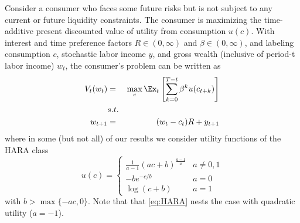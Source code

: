 
Consider a consumer who faces some future risks but is not subject to any current or future liquidity constraints.  The consumer is maximizing the time-additive present discounted value of utility from consumption $u(c)$.  With interest and time preference factors $R \in (0,\infty)$ and $\beta \in (0,\infty)$, and labeling consumption $c$, stochastic labor income $y$, and gross wealth (inclusive of period-t labor income) $w_{t}$, the consumer's problem can be written as
\begin{eqnarray*}
V_{t}(w_{t}) &=&
                 \max_{c} \Ex_{t}\left[\sum_{k=0}^{T-t}\beta^{k} u({c_{t+k}})\right]   \label{eq:valuefn} \\
   & s.t. &  \nonumber
\\              w_{t+1} & = & (w_{t}-c_{t})R+y_{t+1} %
\nonumber
\end{eqnarray*}
where in some (but not all) of our results we consider utility functions of the HARA class
\begin{equation}\label{eq:HARA}
  u(c) = \begin{cases} \frac{1}{a - 1}\left(ac + b\right)^{\frac{a-1}{a}} & a \neq 0,1 \\
-be^{-c/b} & a = 0 \\
\log(c + b) & a = 1 \end{cases} \end{equation}
with $b > \max\{- ac,0\}$. Note that that \eqref{eq:HARA} nests the case with quadratic utility ($a = -1$).


